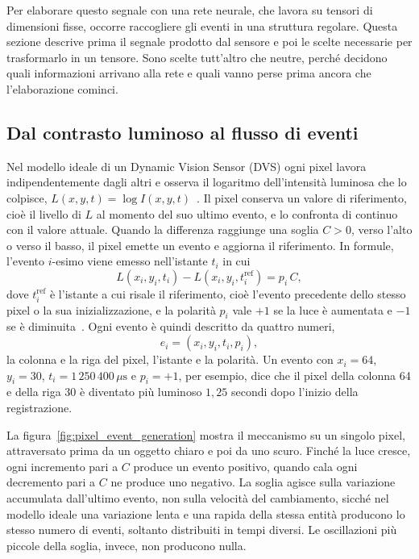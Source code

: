 Per elaborare questo segnale con una rete neurale, che lavora su tensori di dimensioni fisse, occorre raccogliere gli eventi in una struttura regolare. Questa sezione descrive prima il segnale prodotto dal sensore e poi le scelte necessarie per trasformarlo in un tensore. Sono scelte tutt'altro che neutre, perché decidono quali informazioni arrivano alla rete e quali vanno perse prima ancora che l'elaborazione cominci.

\subsection{Dal contrasto luminoso al flusso di eventi}
\label{subsec:contrasto_eventi}

Nel modello ideale di un Dynamic Vision Sensor (DVS) ogni pixel lavora indipendentemente dagli altri e osserva il logaritmo dell'intensità luminosa che lo colpisce, $L(x,y,t)=\log I(x,y,t)$~\cite{lichtsteiner2008dvs}. Il pixel conserva un valore di riferimento, cioè il livello di $L$ al momento del suo ultimo evento, e lo confronta di continuo con il valore attuale. Quando la differenza raggiunge una soglia $C>0$, verso l'alto o verso il basso, il pixel emette un evento e aggiorna il riferimento. In formule, l'evento $i$-esimo viene emesso nell'istante $t_i$ in cui
\begin{equation}
\label{eq:soglia_contrasto}
L(x_i,y_i,t_i)-L(x_i,y_i,t_i^{\mathrm{ref}})=p_i\,C,
\end{equation}
dove $t_i^{\mathrm{ref}}$ è l'istante a cui risale il riferimento, cioè l'evento precedente dello stesso pixel o la sua inizializzazione, e la polarità $p_i$ vale $+1$ se la luce è aumentata e $-1$ se è diminuita~\cite{gallego2022event}. Ogni evento è quindi descritto da quattro numeri,
\begin{equation}
\label{eq:evento_quadrupla}
e_i=(x_i,y_i,t_i,p_i),
\end{equation}
la colonna e la riga del pixel, l'istante e la polarità. Un evento con $x_i=64$, $y_i=30$, $t_i=1\,250\,400\,\mu\mathrm{s}$ e $p_i=+1$, per esempio, dice che il pixel della colonna 64 e della riga 30 è diventato più luminoso $1{,}25$ secondi dopo l'inizio della registrazione.

La figura~\ref{fig:pixel_event_generation} mostra il meccanismo su un singolo pixel, attraversato prima da un oggetto chiaro e poi da uno scuro. Finché la luce cresce, ogni incremento pari a $C$ produce un evento positivo, quando cala ogni decremento pari a $C$ ne produce uno negativo. La soglia agisce sulla variazione accumulata dall'ultimo evento, non sulla velocità del cambiamento, sicché nel modello ideale una variazione lenta e una rapida della stessa entità producono lo stesso numero di eventi, soltanto distribuiti in tempi diversi. Le oscillazioni più piccole della soglia, invece, non producono nulla.

